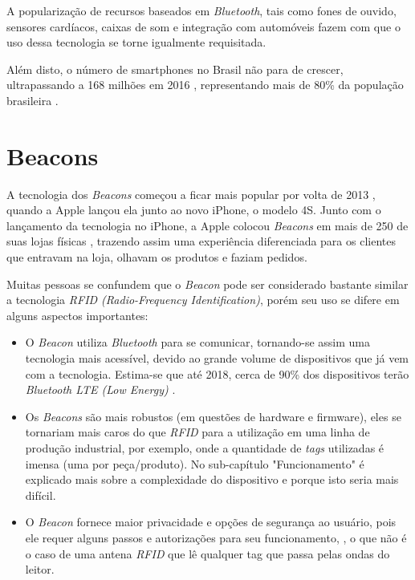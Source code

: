 \documentclass[
	12pt,
	oneside,
	a4paper,
	english,
	brazil,
]{abntex2}
\begin{document}
A popularização de recursos baseados em \emph{Bluetooth}, tais como fones de ouvido, sensores cardíacos, caixas de som e integração com automóveis fazem com que o uso dessa tecnologia se torne igualmente requisitada.

Além disto, o número de smartphones no Brasil não para de crescer, ultrapassando a 168 milhões em 2016 \cite{smartphone-brazil-numbers}, representando mais de 80\% da população brasileira \cite{brazil-population-numbers}.

\section{Beacons}

A tecnologia dos \emph{Beacons} começou a ficar mais popular por volta de 2013 \cite{beacon-what-is-it-forbes}, quando a Apple lançou ela junto ao novo iPhone, o modelo 4S. Junto com o lançamento da tecnologia no iPhone, a Apple colocou \emph{Beacons} em mais de 250 de suas lojas físicas \cite{beacon-apple-store-case}, trazendo assim uma experiência diferenciada para os clientes que entravam na loja, olhavam os produtos e faziam pedidos.

Muitas pessoas se confundem que o \emph{Beacon} pode ser considerado bastante similar a tecnologia \emph{RFID (Radio-Frequency Identification)}, porém seu uso se difere em alguns aspectos importantes:

\begin{itemize}
    \item O \emph{Beacon} utiliza \emph{Bluetooth} para se comunicar, tornando-se assim uma tecnologia mais acessível, devido ao grande volume de dispositivos que já vem com a tecnologia. Estima-se que até 2018, cerca de 90\% dos dispositivos terão \emph{Bluetooth LTE (Low Energy)} \cite{beacon-devices-estimate-2018}.
    \item Os \emph{Beacons} são mais robustos (em questões de hardware e firmware), eles se tornariam mais caros do que \emph{RFID} para a utilização em uma linha de produção industrial, por exemplo, onde a quantidade de \emph{tags} utilizadas é imensa (uma por peça/produto). No sub-capítulo "Funcionamento" é explicado mais sobre a complexidade do dispositivo e porque isto seria mais difícil.
    \item O \emph{Beacon} fornece maior privacidade e opções de segurança ao usuário, pois ele requer alguns passos e autorizações para seu funcionamento, \cite{beacon-apple-store-case}, o que não é o caso de uma antena \emph{RFID} que lê qualquer tag que passa pelas ondas do leitor.
\end{itemize}
\end{document}
